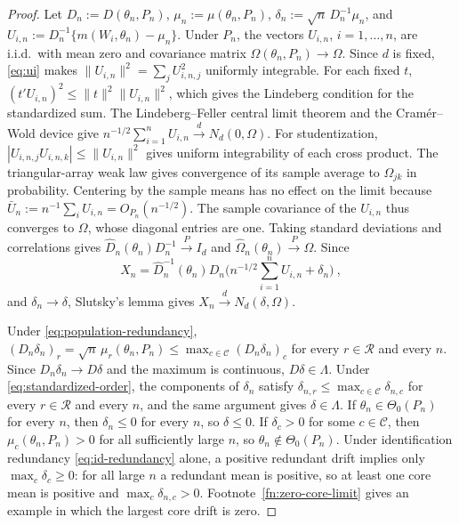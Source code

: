 \documentclass[11pt]{article}
\newcommand{\red}[1]{{\color{red}#1}} %
\numberwithin{equation}{section}
\theoremstyle{definition}
\begin{document}
\begin{proof}
Let $D_n:=D(\theta_n,P_n)$, $\mu_n:=\mu(\theta_n,P_n)$, $\delta_n:=\sqrt n\,D_n^{-1}\mu_n$, and $U_{i,n}:=D_n^{-1}\{m(W_i,\theta_n)-\mu_n\}$. Under $P_n$, the vectors $U_{i,n}$, $i=1,\dots,n$, are i.i.d.\ with mean zero and covariance matrix $\Omega(\theta_n,P_n)\to\Omega$. \red{Since $d$ is fixed, \eqref{eq:ui} makes $\|U_{i,n}\|^2=\sum_j U_{i,n,j}^2$ uniformly integrable. For each fixed $t$, $(t'U_{i,n})^2\le\|t\|^2\|U_{i,n}\|^2$, which gives the Lindeberg condition for the standardized sum.} The Lindeberg--Feller central limit theorem and the Cram\'er--Wold device give $n^{-1/2}\sum_{i=1}^nU_{i,n}\stackrel{d}{\to}N_d(0,\Omega)$. \red{For studentization, $|U_{i,n,j}U_{i,n,k}|\le\|U_{i,n}\|^2$ gives uniform integrability of each cross product. The triangular-array weak law gives convergence of its sample average to $\Omega_{jk}$ in probability. Centering by the sample means has no effect on the limit because $\bar U_n:=n^{-1}\sum_i U_{i,n}=O_{P_n}(n^{-1/2})$. The sample covariance of the $U_{i,n}$ thus converges to $\Omega$, whose diagonal entries are one. Taking standard deviations and correlations gives} $\hat D_n(\theta_n)D_n^{-1}\stackrel{P}{\to}I_d$ and $\hat\Omega_n(\theta_n)\stackrel{P}{\to}\Omega$. Since
\[
X_n=\hat D_n^{-1}(\theta_n)D_n\Big(n^{-1/2}\sum_{i=1}^nU_{i,n}+\delta_n\Big)~,
\]
and $\delta_n\to \delta$, Slutsky's lemma gives $X_n\stackrel{d}{\to}N_d(\delta,\Omega)$.

Under \eqref{eq:population-redundancy}, $(D_n\delta_n)_r=\sqrt n\,\mu_r(\theta_n,P_n)\le\max_{c\in\mathcal C}(D_n\delta_n)_c$ for every $r\in\mathcal R$ and every $n$. Since $D_n\delta_n\to D\delta$ and the maximum is continuous, $D\delta\in\Lambda$. Under \eqref{eq:standardized-order}, the components of $\delta_n$ satisfy $\delta_{n,r}\le\max_{c\in\mathcal C}\delta_{n,c}$ for every $r\in\mathcal R$ and every $n$, and the same argument gives $\delta\in\Lambda$. If $\theta_n\in\Theta_0(P_n)$ for every $n$, then $\delta_n\le0$ for every $n$, so $\delta\le0$. If $\delta_c>0$ for some $c\in\mathcal C$, then $\mu_c(\theta_n,P_n)>0$ for all sufficiently large $n$, so $\theta_n\notin\Theta_0(P_n)$. \red{Under identification redundancy \eqref{eq:id-redundancy} alone, a positive redundant drift implies only $\max_c\delta_c\ge0$: for all large $n$ a redundant mean is positive, so at least one core mean is positive and $\max_c\delta_{n,c}>0$. Footnote~\ref{fn:zero-core-limit} gives an example in which the largest core drift is zero.}
\end{proof}
\end{document}

